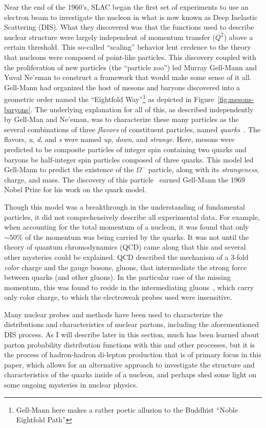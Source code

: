 Near the end of the 1960's, SLAC began the first set of experiments to use an electron beam to investigate the nucleon in what is now known as Deep Inelastic Scattering (DIS). What they discovered was that the functions used to describe nuclear structure were largely independent of momentum transfer ($Q^2$) above a certain threshold. This so-called ``scaling'' behavior lent credence to the theory that nucleons were composed of point-like particles. This discovery coupled with the proliferation of new particles (the ``particle zoo'') led Murray Gell-Mann and Yuval Ne'eman to construct a framework that would make some sense of it all. Gell-Mann had organized the host of mesons and baryons discovered into a geometric order named the ``Eightfold Way''\footnote{Gell-Mann here makes a rather poetic allusion to the Buddhist ``Noble Eightfold Path''} as depicted in Figure~\ref{fig:mesons-baryons}. The underlying explanation for all of this, as described independently by Gell-Man and Ne'eman, was to characterize these many particles as the several combinations of three \emph{flavors} of constituent particles, named \emph{quarks}~\cite{joyce1999finnegans}. The flavors, \emph{u}, \emph{d}, and \emph{s} were named \emph{up}, \emph{down}, and \emph{strange}. Here, mesons were predicted to be composite particles of integer spin containing two quarks and baryons be half-integer spin particles composed of three quarks. This model led Gell-Mann to predict the existence of the $\Omega^-$ particle, along with its \emph{strangeness}, charge, and mass. The discovery of this particle~\cite{1964PhRvL:12204B} earned Gell-Mann the 1969 Nobel Prize for his work on the quark model.

Though this model was a breakthrough in the understanding of fundamental particles, it did not comprehensively describe all experimental data. For example, when accounting for the total momentum of a nucleon, it was found that only $\sim50\%$ of the momentum was being carried by the quarks. It was not until the theory of quantum chromodynamics (QCD) came along that this and several other mysteries could be explained. QCD described the mechanism of a 3-fold \emph{color} charge and the gauge bosons, gluons, that intermediate the strong force between quarks (and other gluons). In the particular case of the missing momentum, this was found to reside in the intermediating gluons~\cite{PhysRevLett.43.830}, which carry only color charge, to which the electroweak probes used were insensitive.

Many nuclear probes and methods have been used to characterize the distributions and characteristics of nuclear partons, including the aforementioned DIS process. As I will describe later in this section, much has been learned about parton probability distribution functions with this and other processes, but it is the process of hadron-hadron di-lepton production that is of primary focus in this paper, which allows for an alternative approach to investigate the structure and characteristics of the quarks inside of a nucleon, and perhaps shed some light on some ongoing mysteries in nuclear physics.

